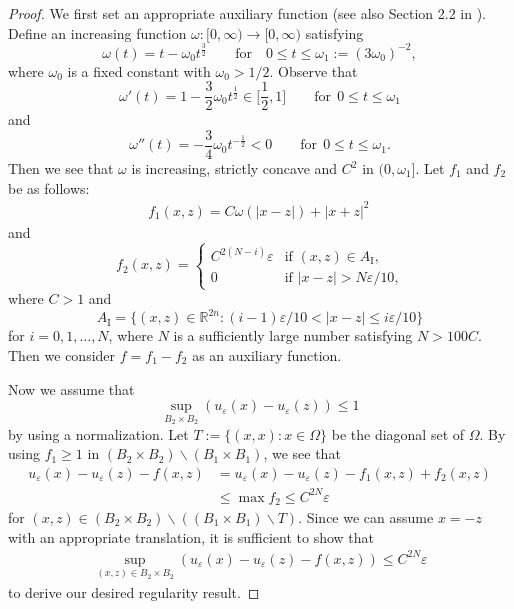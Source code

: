 \documentclass[english]{amsart}
\newcommand{\eps}{\varepsilon}
\theoremstyle{plain}
\theoremstyle{definition}
\theoremstyle{remark}
\numberwithin{equation}{section}
\begin{document}
\begin{proof}
We first set an appropriate auxiliary function (see also Section 2.2 in \cite{MR4125101}). 
Define an increasing function $\omega:[0,\infty)\to[0,\infty)$ satisfying
$$\omega(t) = t- \omega_{0}t^{\frac{3}{2}}  \qquad \textrm{for} \quad 0 \le t \le \omega_{1} := (3 \omega_{0})^{-2},$$ where $ \omega_{0} $ is a fixed constant with $\omega_0>1/2$. 
Observe that $$ \omega '(t) = 1-\frac{3}{2}\omega_{0}t^{\frac{1}{2}} \in \bigg[ \frac{1}{2},1 \bigg] \qquad \textrm{for} \ \ 0 \le t \le \omega_{1}$$ and$$ \omega ''(t) = -\frac{3}{4}\omega_{0}t^{-\frac{1}{2}} <0 \qquad \textrm{for} \ \ 0 \le t \le \omega_{1}.$$
Then we see that $\omega$ is increasing, strictly concave and $C^{2}$ in $(0, \omega_1]$.
Let $f_1$ and $f_2$ be as follows:
\[
\begin{split}
f_1(x,z)=C\omega(|x-z|)+|x+z|^2\,
\end{split}
\]
and
\begin{equation*} f_{2}(x, z) = \left\{ \begin{array}{ll}
C^{2(N-i)} \eps & \textrm{if $(x, z) \in A_{\textrm{I}}$,}\\
0 & \textrm{if $|x-z|>N \eps / 10 $,}
\end{array} \right.
\end{equation*}
where $C>1$ and
$$A_{\textrm{I}} = \{ (x , z) \in \mathbb R ^ {2n} : (i-1) \eps / 10 < |x-z| \le i \eps / 10 \} $$ for $ i = 0, 1, ... , N$, where $N$ is a sufficiently large number satisfying $N>100C$.  
Then we consider $f=f_1-f_2$ as an auxiliary function.

Now we assume that $$\sup_{B_2\times B_2} (u_{\eps}(x)-u_{\eps}(z)) \le 1$$
by using a normalization.
Let $T:=\{(x,x)  : x\in \Omega\} $ be the diagonal set of $\Omega$.
By using $f_1\geq 1$ in $(B_{2}\times B_{2}) \backslash (B_{1}\times B_{1})$,
we see that 
\begin{equation} \label{as2}
\begin{split}
u_{\eps}(x)-u_{\eps}(z)-f(x,z)
&= u_{\eps}(x)-u_{\eps}(z)-f_1(x,z)+f_2(x,z)\\ 
&\leq \max f_2
\le C^{2N}\eps 
\end{split}
\end{equation}
for $(x,z) \in (B_{2}\times B_{2}) \backslash ((B_{1}\times B_{1})\backslash T)$.
Since we can assume $x=-z$ with an appropriate translation, it is sufficient to show that
\begin{align}\label{wts_o}
\sup_{(x,z) \in  B_{2}\times B_{2}  } (u_{\eps}(x)-u_{\eps}(z)-f(x,z))\le C^{2N}\eps 
\end{align}
to derive our desired regularity result.



\end{proof}
\end{document}
